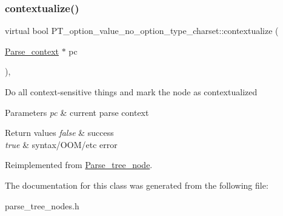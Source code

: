 \subsubsection{\texorpdfstring{contextualize()}{contextualize()}}
{\footnotesize\ttfamily virtual bool P\+T\+\_\+option\+\_\+value\+\_\+no\+\_\+option\+\_\+type\+\_\+charset\+::contextualize (\begin{DoxyParamCaption}\item[{\mbox{\hyperlink{structParse__context}{Parse\+\_\+context}} $\ast$}]{pc }\end{DoxyParamCaption})\hspace{0.3cm}{\ttfamily [inline]}, {\ttfamily [virtual]}}

Do all context-\/sensitive things and mark the node as contextualized


\begin{DoxyParams}{Parameters}
{\em pc} & current parse context\\
\hline
\end{DoxyParams}

\begin{DoxyRetVals}{Return values}
{\em false} & success \\
\hline
{\em true} & syntax/\+O\+O\+M/etc error \\
\hline
\end{DoxyRetVals}


Reimplemented from \mbox{\hyperlink{classParse__tree__node_a22d93524a537d0df652d7efa144f23da}{Parse\+\_\+tree\+\_\+node}}.



The documentation for this class was generated from the following file\+:\begin{DoxyCompactItemize}
\item 
parse\+\_\+tree\+\_\+nodes.\+h\end{DoxyCompactItemize}
